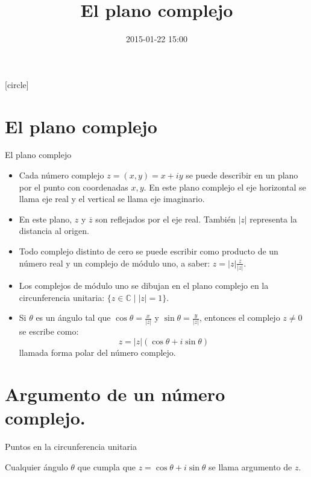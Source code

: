 \documentclass[spanish,presentation]{beamer}
\date{2015-01-22 15:00}
\title{El plano complejo}
\begin{document}
\maketitle
{}
[circle]

\tableofcontents

\section{El plano complejo}
\label{sec-1}

\begin{frame}[label=sec-1-1]{El plano complejo}
\begin{itemize}
\item Cada número complejo \(z=(x,y)=x+iy\) se puede describir en un plano
por el punto con coordenadas \(x,y\). En este \alert{plano complejo} el
eje horizontal se llama \alert{eje real} y el vertical se llama \alert{eje imaginario}.
\item En este plano, \(z\) y \(\overline{z}\) son reflejados por el eje
real. También \(|z|\) representa la distancia al origen.
\item Todo complejo distinto de cero se puede escribir como producto de
un número real y un complejo de módulo uno, a saber:
\(z=|z|\frac{z}{|z|}\).
\item Los complejos de módulo uno se dibujan en el plano complejo en la
\alert{circunferencia unitaria}: \(\{z\in \mathbb{C}\mid |z|=1\}\).
\item Si \(\theta\) es un ángulo tal que \(\cos\theta=\frac{x}{|z|}\) y
\(\sin\theta=\frac{y}{|z|}\), entonces el complejo \(z\ne 0\) se
escribe como:
\begin{displaymath}
z=|z|(\cos \theta+i\sin\theta)
\end{displaymath}
llamada \alert{forma polar} del número complejo.
\end{itemize}
\end{frame}

\section{Argumento de un número complejo.}
\label{sec-2}

\begin{frame}[label=sec-2-1]{Puntos en la circunferencia unitaria}
\begin{figure}[htb]
\centering

\end{figure}


Cualquier ángulo \(\theta\) que cumpla que
\(z=\cos\theta+i\sin\theta\) se llama \alert{argumento} de \(z\).
\end{frame}
\end{document}
